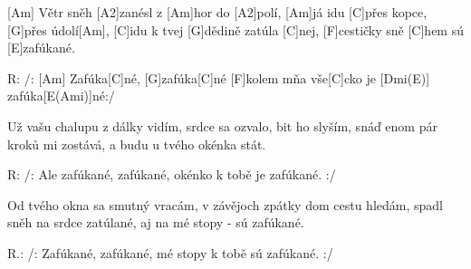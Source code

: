 
[Am] Větr sněh [A2]zanésl z [Am]hor do [A2]polí,
[Am]já idu [C]přes kopce, [G]přes údolí[Am],
[C]idu k tvej [G]dědině zatúla [C]nej,
[F]cestičky sně [C]hem sú [E]zafúkané.

R: /: [Am] Zafúka[C]né, [G]zafúka[C]né 
[F]kolem mňa vše[C]cko je [Dmi(E)] zafúka[E(Ami)]né:/

Už vašu chalupu z dálky vidím,
srdce sa ozvalo, bit ho slyším,
snáď enom pár kroků mi zostává,
a budu u tvého okénka stát.

R: /: Ale zafúkané, zafúkané,
okénko k tobě je zafúkané. :/

Od tvého okna sa smutný vracám,
v závějoch zpátky dom cestu hledám,
spadl sněh na srdce zatúlané,
aj na mé stopy - sú zafúkané.

R.: /: Zafúkané, zafúkané,
mé stopy k tobě sú zafúkané. :/ 


